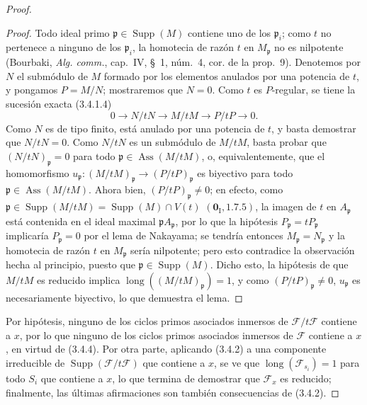 \begin{proof}
\begin{proof}
Todo ideal primo $\mathfrak p\in\operatorname{Supp}(M)$ contiene uno de los
$\mathfrak p_i$; como $t$ no pertenece a ninguno de los $\mathfrak p_i$, la
homotecia de razón $t$ en $M_{\mathfrak p}$ no es nilpotente (Bourbaki,
\emph{Alg. comm.}, cap.~IV, \S~1, núm.~4, cor. de la prop.~9). Denotemos por
$N$ el submódulo de $M$ formado por los elementos anulados por una potencia de
$t$, y pongamos $P=M/N$; mostraremos que $N=0$. Como $t$ es $P$-regular, se
tiene la sucesión exacta (3.4.1.4)
\[
0\longrightarrow N/tN\longrightarrow M/tM\longrightarrow P/tP
\longrightarrow0.
\]
Como $N$ es de tipo finito, está anulado por una potencia de $t$, y basta
demostrar que $N/tN=0$. Como $N/tN$ es un submódulo de $M/tM$, basta probar
que $(N/tN)_{\mathfrak p}=0$ para todo
$\mathfrak p\in\operatorname{Ass}(M/tM)$, o, equivalentemente, que el
homomorfismo
$u_{\mathfrak p}:(M/tM)_{\mathfrak p}\longrightarrow(P/tP)_{\mathfrak p}$
es biyectivo para todo $\mathfrak p\in\operatorname{Ass}(M/tM)$. Ahora bien,
$(P/tP)_{\mathfrak p}\neq0$; en efecto, como
$\mathfrak p\in\operatorname{Supp}(M/tM)
=\operatorname{Supp}(M)\cap V(t)$ $(\mathbf{0}_{\mathrm I},1.7.5)$, la imagen de $t$
en $A_{\mathfrak p}$ está contenida en el ideal maximal
$\mathfrak pA_{\mathfrak p}$, por lo que la hipótesis
$P_{\mathfrak p}=tP_{\mathfrak p}$ implicaría $P_{\mathfrak p}=0$ por el lema
de Nakayama; se tendría entonces $M_{\mathfrak p}=N_{\mathfrak p}$ y la
homotecia de razón $t$ en $M_{\mathfrak p}$ sería nilpotente; pero esto
contradice la observación hecha al principio, puesto que
$\mathfrak p\in\operatorname{Supp}(M)$. Dicho esto, la hipótesis de que $M/tM$
es reducido implica $\operatorname{long}((M/tM)_{\mathfrak p})=1$, y como
$(P/tP)_{\mathfrak p}\neq0$, $u_{\mathfrak p}$ es necesariamente biyectivo,
lo que demuestra el lema.
\end{proof}

Por hipótesis, ninguno de los ciclos primos asociados inmersos de
$\mathcal F/t\mathcal F$ contiene a $x$, por lo que ninguno de los ciclos
primos asociados inmersos de $\mathcal F$ contiene a $x$, en virtud de
(3.4.4). Por otra parte, aplicando (3.4.2) a una componente irreducible de
$\operatorname{Supp}(\mathcal F/t\mathcal F)$ que contiene a $x$, se ve que
$\operatorname{long}(\mathcal F_{s_i})=1$ para todo $S_i$ que contiene a $x$,
lo que termina de demostrar que $\mathcal F_x$ es reducido; finalmente, las
últimas afirmaciones son también consecuencias de (3.4.2).
\end{proof}

